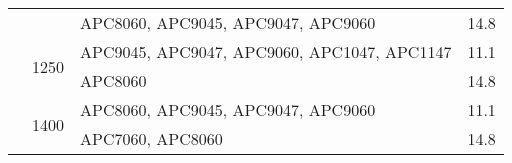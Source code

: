 \begin{table}[H]
\begin{tabularx}{\linewidth}{l l X l}
		\cmidrule(l){3-4}
		& & {APC8060}, {APC9045}, {APC9047}, {APC9060} & 14.8 \\
		\cmidrule(l){2-4}
		& \multirow{2}{*}{1250} & {APC9045}, {APC9047}, {APC9060}, {APC1047}, {APC1147} & 11.1 \\
		\cmidrule(l){3-4}
		& & {APC8060} & 14.8 \\
		\cmidrule(l){2-4}
		& \multirow{2}{*}{1400} & {APC8060}, {APC9045}, {APC9047}, {APC9060} & 11.1 \\
		\cmidrule(l){3-4}
		& & {APC7060}, {APC8060} & 14.8 \\
		\cmidrule(l){2-4}
		\bottomrule
	\end{tabularx}
\end{table}

